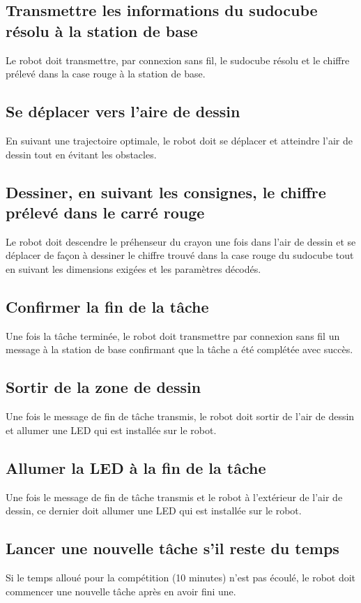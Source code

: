 \subsection{Transmettre les informations du sudocube résolu à la station de base}
Le robot doit transmettre, par connexion sans fil, le sudocube résolu et le chiffre prélevé dans la case rouge à la station de base.
\subsection{Se déplacer vers l'aire de dessin}
En suivant une trajectoire optimale, le robot doit se déplacer et atteindre l'air de dessin tout en évitant les obstacles.
\subsection{Dessiner, en suivant les consignes, le chiffre prélevé dans le carré rouge}
Le robot doit descendre le préhenseur du crayon une fois dans l'air de dessin et se déplacer de façon à dessiner le chiffre trouvé dans la case rouge du sudocube tout en suivant les dimensions exigées et les paramètres décodés.
\subsection{Confirmer la fin de la tâche}
Une fois la tâche terminée, le robot doit transmettre par connexion sans fil un message à la station de base confirmant que la tâche a été complétée avec succès.
\subsection{Sortir de la zone de dessin}
Une fois le message de fin de tâche transmis, le robot doit sortir de l'air de dessin et allumer une LED qui est installée sur le robot.
\subsection{Allumer la LED à la fin de la tâche}
Une fois le message de fin de tâche transmis et le robot à l'extérieur de l'air de dessin, ce dernier doit allumer une LED qui est installée sur le robot.
\subsection{Lancer une nouvelle tâche s'il reste du temps}
Si le temps alloué pour la compétition (10 minutes) n'est pas écoulé, le robot doit commencer une nouvelle tâche après en avoir fini une.
